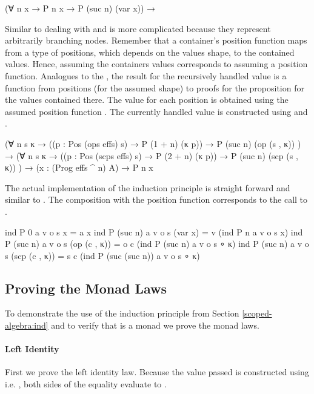 \begin{AgdaAlign}
\begin{code}
  (∀ {n x} → P n x → P (suc n) (var x))  →
\end{code}
Similar to  dealing with  and
 is more complicated because they represent
arbitrarily branching nodes.
Remember that a container's position function maps from a type of positions,
which depends on the values shape, to the contained values.
Hence, assuming the containers values corresponds to assuming a position
function.
Analogues to the , the result for the recursively handled value
is a function from positions (for the assumed shape) to proofs for the
proposition for the values contained there.
The value for each position is obtained using the assumed position function
.
The currently handled value is constructed using  and  
.
\begin{code}
  (∀ {n} s {κ}  →  ((p : Pos (ops   effs) s) → P (1 + n)  (κ p))  → P (suc n) (op   (s , κ))  )  →
  (∀ {n} s {κ}  →  ((p : Pos (scps  effs) s) → P (2 + n)  (κ p))  → P (suc n) (scp  (s , κ))  )  →
  (x : (Prog effs ^ n) A) → P n x
\end{code}
The actual implementation of the induction principle is straight forward and
similar to .
The composition with the position function corresponds to the call to
.
\begin{code}
ind P 0       a v o s x               = a x
ind P (suc n) a v o s (var x)         = v    (ind P n              a v o s x)
ind P (suc n) a v o s (op   (c , κ))  = o c  (ind P (suc n)        a v o s ∘ κ)
ind P (suc n) a v o s (scp  (c , κ))  = s c  (ind P (suc (suc n))  a v o s ∘ κ)
\end{code}
\end{AgdaAlign}


\subsection{Proving the Monad Laws}
\label{scoped-algebra:monad-laws}

To demonstrate the use of the induction principle from Section
\ref{scoped-algebra:ind} and to verify that 
\AgdaSpace{}\AgdaSpace{}
is a monad we prove the monad laws.

\paragraph{Left Identity}
First we prove the left identity law.
Because the value passed \AgdaFunction{>>=} is constructed using
 i.e. , both sides of the
equality evaluate to \AgdaSpace{}.

